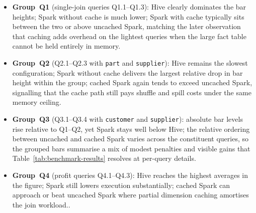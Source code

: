 \begin{itemize}
    \item \textbf{Group~Q1} (single-join queries Q1.1--Q1.3): Hive clearly
    dominates the bar heights; Spark without cache is much lower; Spark with
    cache typically sits between the two or above uncached Spark, matching the
    later observation that caching adds overhead on the lightest queries when
    the large fact table cannot be held entirely in memory.
    \item \textbf{Group~Q2} (Q2.1--Q2.3 with \texttt{part} and
    \texttt{supplier}): Hive remains the slowest configuration; Spark without
    cache delivers the largest relative drop in bar height within the group;
    cached Spark again tends to exceed uncached Spark, signalling that the
    cache path still pays shuffle and spill costs under the same memory ceiling.
    \item \textbf{Group~Q3} (Q3.1--Q3.4 with \texttt{customer} and
    \texttt{supplier}): absolute bar levels rise relative to Q1--Q2, yet Spark
    stays well below Hive; the relative ordering between uncached and cached
    Spark varies across the constituent queries, so the grouped bars summarise
    a mix of modest penalties and visible gains that Table~\ref{tab:benchmark-results}
    resolves at per-query details.
    \item \textbf{Group~Q4} (profit queries Q4.1--Q4.3): Hive reaches the highest
    averages in the figure; Spark still lowers execution substantially; cached
    Spark can approach or beat uncached Spark where partial dimension caching
    amortises the join workload..
\end{itemize}

